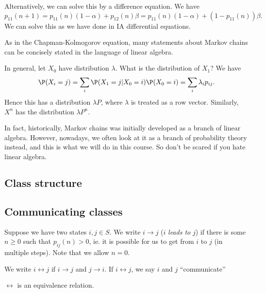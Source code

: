 \documentclass[a4paper]{article}
\begin{document}
\begin{eg}
  Alternatively, we can solve this by a difference equation. We have
  \[
    p_{11}(n + 1) = p_{11}(n)(1 - \alpha) + p_{12}(n)\beta = p_{11}(n)(1 - \alpha) + (1 - p_{11}(n))\beta.
  \]
  We can solve this as we have done in IA differential equations.
\end{eg}
As in the Chapman-Kolmogorov equation, many statements about Markov chains can be concisely stated in the language of linear algebra.

In general, let $X_0$ have distribution $\lambda$. What is the distribution of $X_1$? We have
\[
  \P(X_i = j) = \sum_i \P(X_1 = j| X_0 = i)\P(X_0 = i) = \sum_i \lambda_i p_{ij}.
\]
Hence this has a distribution $\lambda P$, where $\lambda$ is treated as a row vector. Similarly, $X^n$ has the distribution $\lambda P^n$.

In fact, historically, Markov chains was initially developed as a branch of linear algebra. However, nowadays, we often look at it as a branch of probability theory instead, and this is what we will do in this course. So don't be scared if you hate linear algebra.

\subsection{Class structure}
\subsection{Communicating classes}
\begin{defi}
  Suppose we have two states $i, j\in S$. We write $i \to j$ ($i$ \emph{leads to} $j$) if there is some $n \geq 0$ such that $p_{ij}(n) > 0$, ie. it is possible for us to get from $i$ to $j$ (in multiple steps). Note that we allow $n = 0$.

  We write $i \leftrightarrow j$ if $i \to j$ and $j \to i$. If $i \leftrightarrow j$, we say $i$ and $j$ ``communicate''
\end{defi}

\begin{prop}
  $\leftrightarrow$ is an equivalence relation.
\end{prop}
\end{document}
